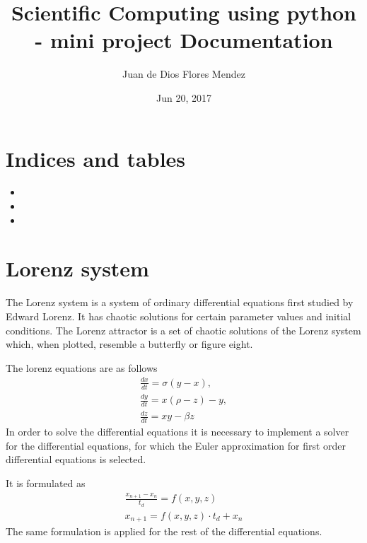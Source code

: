 \documentclass[letterpaper,10pt,english]{sphinxmanual}
\title{Scientific Computing using python - mini project Documentation}
\date{Jun 20, 2017}
\author{Juan de Dios Flores Mendez}
\begin{document}
\maketitle
\sphinxtableofcontents
{}\label{\detokenize{index::doc}}



\chapter{Indices and tables}
\label{\detokenize{index:welcome-to-scientific-computing-using-python-mini-project-s-documentation}}\label{\detokenize{index:indices-and-tables}}\begin{itemize}
\item {} 

\item {} 

\item {} 

\end{itemize}


\chapter{Lorenz system}
\label{\detokenize{index:lorenz-system}}
The Lorenz system is a system of ordinary differential equations first studied by Edward Lorenz. It has chaotic solutions for certain parameter values and initial conditions. The Lorenz attractor is a set of chaotic solutions of the Lorenz system which, when plotted, resemble a butterfly or figure eight.

The lorenz equations are as follows
\begin{equation*}
\begin{split}\frac{dx}{dt} = \sigma (y-x), \\
\frac{dy}{dt} = x(\rho - z) - y, \\
\frac{dz}{dt} = xy - \beta z\end{split}
\end{equation*}
In order to solve the differential equations it is necessary to implement a solver for the differential equations, for which the Euler approximation for first order differential equations is selected.

It is formulated as
\begin{equation*}
\begin{split}\frac{x_{n+1} - x_n}{t_d} = f(x,y,z) \\
x_{n+1} = f(x,y,z) \cdot t_d + x_n\end{split}
\end{equation*}
The same formulation is applied for the rest of the differential equations.
\end{document}
